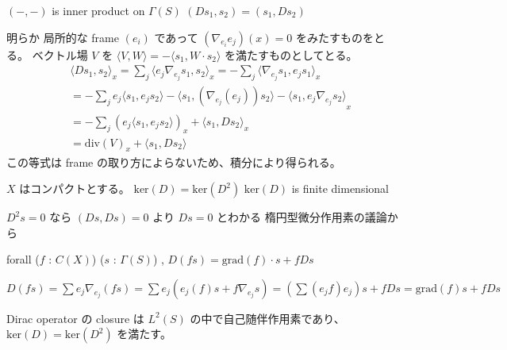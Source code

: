 \begin{Theorem}
\itemprop
  \((- , -)\) is inner product on \(\Gamma(S)\)
\itemprop
  \((D s_1 , s_2) = (s_1 , D s_2)\)
\end{Theorem}

\begin{Proof}
\itemprof
  明らか
\itemprof
  局所的な frame \((e_i)\) であって \((\nabla_{e_i} e_j) (x) = 0\) をみたすものをとる。
  ベクトル場 \(V\) を \(\langle V , W \rangle = - \langle s_1 , W \cdot s_2 \rangle\) を満たすものとしてとる。
  \begin{align*}
    & \langle D s_1 , s_2 \rangle _x = \sum_j \langle e_j \nabla_{e_j} s_1 , s_2 \rangle _x = - \sum_j \langle \nabla_{e_j} s_1 , e_j s_1 \rangle _x \\
    &= - \sum_j {e_j \langle s_1 , e_j s_2 \rangle - \langle s_1 , (\nabla_{e_j}(e_j)) s_2 \rangle - \langle  s_1 , e_j \nabla_{e_j} s_2 \rangle}_x \\
    &= - \sum_j (e_j \langle s_1 , e_j s_2 \rangle)_x + \langle s_1 , D s_2 \rangle_x \\
    &= \text{div}(V)_x + \langle s_1 , D s_2 \rangle
  \end{align*}
  この等式は frame の取り方によらないため、積分により得られる。
\end{Proof}

\begin{Theorem}
\itemwhen \(X\) はコンパクトとする。
\itemprop
  \(\text{ker}(D) = \text{ker}(D^2)\)
\itemprop
  \(\text{ker}(D)\) is finite dimensional
\end{Theorem}

\begin{Proof}
\itemprof
  \(D^2 s = 0\) なら \((D s , D s) = 0\) より \(D s = 0\) とわかる
\itemprof
  楕円型微分作用素の議論から
\end{Proof}

\begin{Theorem}
\itemprop
  forall (\(f\) : \(C(X)\)) (\(s\) : \(\Gamma(S)\)) , \(D(f s) = \text{grad}(f) \cdot s + f D s\)
\end{Theorem}

\begin{Proof}
\itemprof
  \(D(f s) = \sum e_j \nabla_{e_j}(f s) = \sum e_j (e_j(f) s + f \nabla_{e_j} s) = (\sum (e_j f) e_j) s + f D s = \text{grad}(f) s + f D s\)
\end{Proof}

\begin{Theorem}
\itemprop
  Dirac operator の closure は \(L^2(S)\) の中で自己随伴作用素であり、 \(\text{ker}(D) = \text{ker}(D^2)\) を満たす。
\end{Theorem}

